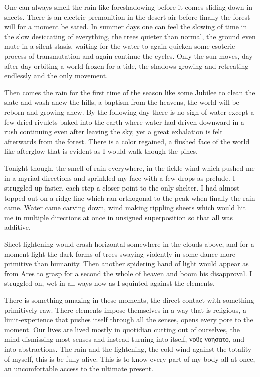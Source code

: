 \documentclass[ebook, 10pt, openright, onecolumn]{memoir}
\newcommand{\textgreek}[1]{\begingroup\fontencoding{LGR}\selectfont#1\endgroup}
\newlength{\drop}
\begin{document}
One can always smell the rain like foreshadowing before it comes sliding down in
sheets.  There is an electric premonition in the desert air before finally the
forest will for a moment be sated.  In summer days one can feel the slowing of
time in the slow desiccating of everything, the trees quieter than normal, the
ground even mute in a silent stasis, waiting for the water to again quicken some
esoteric process of transmutation and again continue the cycles.  Only the sun
moves, day after day orbiting a world frozen for a tide, the shadows growing and
retreating endlessly and the only movement.

Then comes the rain for the first time of the season like some Jubilee to clean
the slate and wash anew the hills, a baptism from the heavens, the world will be
reborn and growing anew.  By the following day there is no sign of water except
a few dried rivulets baked into the earth where water had driven downward in a
rush continuing even after leaving the sky, yet a great exhalation is felt
afterwards from the forest.  There is a color regained, a flushed face of the
world like afterglow that is evident as I would walk though the pines.

Tonight though, the smell of rain everywhere, in the fickle wind which pushed me
in a myriad directions and sprinkled my face with a few drops as prelude.  I
struggled up faster, each step a closer point to the only shelter.  I had almost
topped out on a ridge-line which ran orthogonal to the peak when finally the
rain came.  Water came carving down,  wind making rippling
sheets which would hit me in multiple directions at once in unsigned
superposition so that all was additive.

Sheet lightening would crash horizontal somewhere in the clouds above, and for a
moment light the dark forms of trees swaying violently in some dance more
primitive than humanity.  Then another spidering hand of light would appear as
from Ares to grasp for a second the whole of heaven and boom his disapproval.  I
struggled on, wet in all ways now as I squinted against the elements. 

There is something amazing in these moments, the direct contact with something
primitively raw.  There elements impose themselves in a way that is religious, a
limit-experience that pushes itself through all the senses, opens every pore to
the moment.  Our lives are lived mostly in quotidian cutting out of ourselves,
the mind dismissing most senses and instead turning into itself, \textgreek{νοῦς
  νοήσατο},  and into abstractions.  The rain and the lightening, the cold
wind against the totality of myself, this is be fully alive.  This is to know
every part of my body all at once, an uncomfortable access to the ultimate
present.
\end{document}
